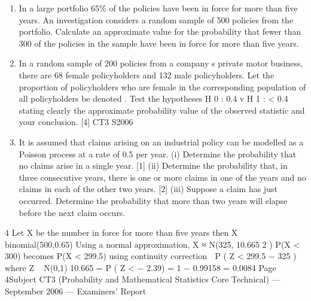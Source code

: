 \documentclass[a4paper,12pt]{article}
\begin{document}
\begin{enumerate}

\item In a large portfolio 65\% of the policies have been in force for more than five years.
An investigation considers a random sample of 500 policies from the portfolio.
Calculate an approximate value for the probability that fewer than 300 of the policies
in the sample have been in force for more than five years.


\item In a random sample of 200 policies from a company s private motor business, there
are 68 female policyholders and 132 male policyholders.
Let the proportion of policyholders who are female in the corresponding population of
all policyholders be denoted .
Test the hypotheses
H 0 :
0.4 v H 1 :
< 0.4
stating clearly the approximate probability value of the observed statistic and your
conclusion.
[4]
CT3 S2006
\item It is assumed that claims arising on an industrial policy can be modelled as a Poisson
process at a rate of 0.5 per year.
(i) Determine the probability that no claims arise in a single year.
[1]
(ii) Determine the probability that, in three consecutive years, there is one or more
claims in one of the years and no claims in each of the other two years.
[2]
(iii) Suppose a claim has just occurred. Determine the probability that more than
two years will elapse before the next claim occurs.
\end{enumerate}
\newpage

4
Let X be the number in force for more than five years
then X ~ binomial(500,0.65)
Using a normal approximation, X ≈ N(325, 10.665 2 )
P(X < 300) becomes P(X < 299.5) using continuity correction
 P ( Z <
299.5 − 325
) where Z ~ N(0,1)
10.665
= P ( Z < − 2.39) = 1 − 0.99158 = 0.0084
Page 4Subject CT3 (Probability and Mathematical Statistics Core Technical) — September 2006 — Examiners’ Report
\end{document}

